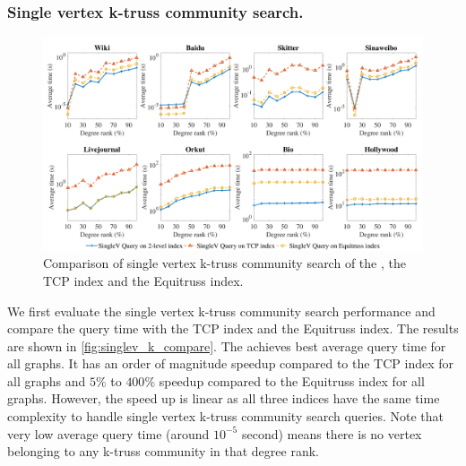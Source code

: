\subsubsection{Single vertex k-truss community search.}
\label{eval_singlev_k_compare}

\begin{figure}[ht]
    \centering
    \includegraphics[width=\linewidth]{./figures/singlev_k_compare.pdf}
    \caption{Comparison of single vertex k-truss community search of the \twolevelindex{}, the TCP index and the Equitruss index.}
    \label{fig:singlev_k_compare}
\end{figure}

We first evaluate the single vertex k-truss community search performance and compare the query time with the TCP index and the Equitruss index. The results are shown in \autoref{fig:singlev_k_compare}. The \twolevelindex{} achieves best average query time for all graphs. It has an order of magnitude speedup compared to the TCP index for all graphs and $5\%$ to $400\%$ speedup compared to the Equitruss index for all graphs. However, the speed up is linear as all three indices have the same time complexity to handle single vertex k-truss community search queries. Note that very low average query time (around $10^{-5}$ second) means there is no vertex belonging to any k-truss community in that degree rank.

